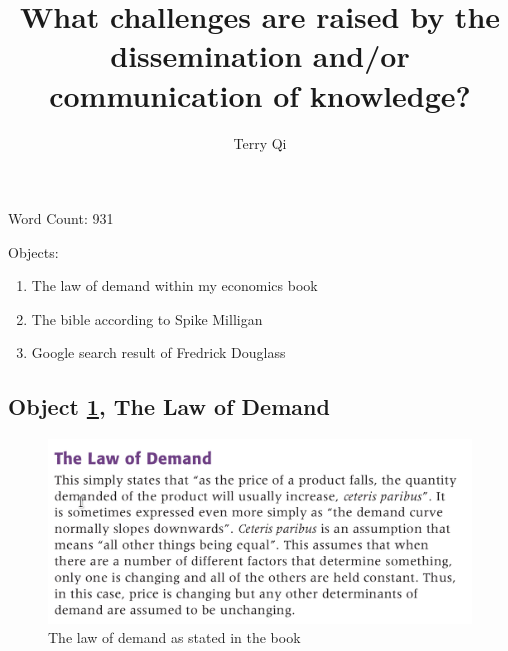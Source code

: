 \documentclass[a4paper,11pt]{article}
\title{What challenges are raised by the dissemination and/or communication of knowledge?}
\author{Terry Qi}
\begin{document}
\maketitle

Word Count: 931

Objects:
\begin{enumerate}
 \item The law of demand within my economics book
 \item The bible according to Spike Milligan
 \item Google search result of Fredrick Douglass
\end{enumerate}

\newpage




\subsection*{Object \ref{fig:lod}, The Law of Demand}

\begin{figure}[h!]
 \centering
 \includegraphics[scale=0.3]{ecobook.png}
 \caption{The law of demand as stated in the book}
 \label{fig:lod}
\end{figure}
\end{document}
